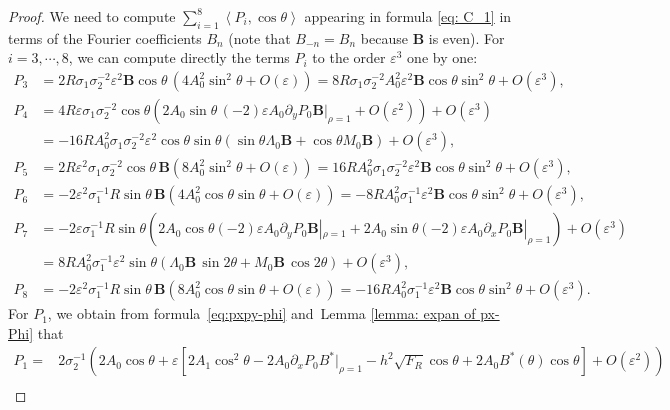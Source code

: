 \documentclass[12pt,reqno]{amsart}
\numberwithin{equation}{section}
\theoremstyle{definition}
\theoremstyle{remark}
\begin{document}
\begin{proof}
We need to compute  $ \sum_{i=1}^8\left\langle P_i, \cos \theta\right\rangle $ appearing in formula \eqref{eq: C_1} in terms of the Fourier coefficients $ B_n$ (note that $  B_{-n} =  B_n$ because $\textbf{B}$ is even). For $ i=3,\cdots,8 $, we can compute directly the terms $ P_i $  to the order $ \varepsilon^3 $ one by one:
\begin{align*}
P_3&=2R\sigma_1\sigma_2^{-2}\varepsilon^2  \textbf{B}\cos\theta\,(4A_0^2\sin^2\theta+O(\varepsilon)) =8R\sigma_1\sigma_2^{-2}A_0^2\varepsilon^2  \textbf{B}\cos\theta\sin^2\theta+O\left (\varepsilon^3\right ), \\
P_4&=4R\varepsilon\sigma_1\sigma_2^{-2}\cos\theta
\left(2A_0\sin\theta\,(-2)\varepsilon A_0\partial_yP_0\textbf{B}|_{\rho=1}+O(\varepsilon^2)\right)+O\left (\varepsilon^3\right ) \\
&=-16RA_0^2\sigma_1\sigma_2^{-2}\varepsilon^2\cos\theta\sin\theta
\left (\sin\theta\Lambda_0\textbf{B}+\cos\theta M_0\textbf{B}\right )+O\left (\varepsilon^3\right ), \\
P_5&=2R\varepsilon^2\sigma_1\sigma_2^{-2}\cos\theta\,\textbf{B}\left (8A_0^2\sin^2\theta+O(\varepsilon)\right )  =16RA_0^2\sigma_1\sigma_2^{-2}\varepsilon^2\textbf{B}\cos\theta\sin^2\theta+O\left (\varepsilon^3\right ), \\
P_6&=-2\varepsilon^2\sigma_1^{-1}R\sin\theta\,\textbf{B}\left (4A_0^2\cos\theta\sin\theta+O(\varepsilon)\right )  =-8RA_0^2\sigma_1^{-1}\varepsilon^2\textbf{B}\cos\theta\sin^2\theta+O\left (\varepsilon^3\right ), \\
P_7&=-2\varepsilon\sigma_1^{-1}R\sin\theta
\left(2A_0\cos\theta(-2)\varepsilon A_0\partial_yP_0\textbf{B}|_{\rho=1}+2A_0\sin\theta(-2)\varepsilon A_0\partial_xP_0\textbf{B}|_{\rho=1}\right)+O\left (\varepsilon^3\right ) \\
&=8RA_0^2\sigma_1^{-1}\varepsilon^2\sin\theta
\left (\Lambda_0 \textbf{B}\, \sin2\theta+
 M_0\textbf{B}\, \cos2\theta\right )+O\left (\varepsilon^3\right ),\\
P_8&=-2\varepsilon^2\sigma_1^{-1}R\sin\theta\,\textbf{B}\left (8A_0^2\cos\theta\sin\theta+O(\varepsilon)\right )  =-16RA_0^2\sigma_1^{-1}\varepsilon^2\textbf{B}\cos\theta\sin^2\theta+O\left (\varepsilon^3\right ).
\end{align*}
For $P_1$, we obtain from formula~\eqref{eq:pxpy-phi} and~Lemma \ref{lemma: expan of px-Phi} that
\begin{align*}
P_1
=&2\sigma_2^{-1}\left (2A_0\cos\theta+\varepsilon[2A_1\cos^2\theta-2A_0\partial_xP_0B^*|_{\rho=1}
-h^2\sqrt{F_R}\cos\theta+2A_0B^*(\theta)\cos\theta]+O(\varepsilon^2)\right ) \\

\end{align*}
\end{proof}
\end{document}
